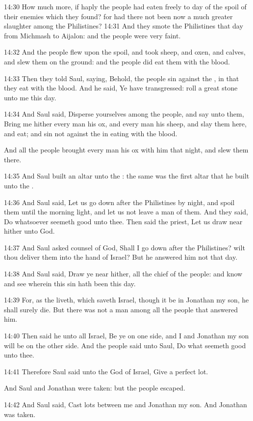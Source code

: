 14:30 How much more, if haply the people had eaten freely to day of the spoil of their enemies which they found? for had there not been now a much greater slaughter among the Philistines?  14:31 And they smote the Philistines that day from Michmash to Aijalon: and the people were very faint.

14:32 And the people flew upon the spoil, and took sheep, and oxen, and calves, and slew them on the ground: and the people did eat them with the blood.

14:33 Then they told Saul, saying, Behold, the people sin against the \LORD, in that they eat with the blood. And he said, Ye have transgressed: roll a great stone unto me this day.

14:34 And Saul said, Disperse yourselves among the people, and say unto them, Bring me hither every man his ox, and every man his sheep, and slay them here, and eat; and sin not against the \LORD in eating with the blood.

And all the people brought every man his ox with him that night, and slew them there.

14:35 And Saul built an altar unto the \LORD: the same was the first altar that he built unto the \LORD.

14:36 And Saul said, Let us go down after the Philistines by night, and spoil them until the morning light, and let us not leave a man of them. And they said, Do whatsoever seemeth good unto thee. Then said the priest, Let us draw near hither unto God.

14:37 And Saul asked counsel of God, Shall I go down after the Philistines? wilt thou deliver them into the hand of Israel? But he answered him not that day.

14:38 And Saul said, Draw ye near hither, all the chief of the people: and know and see wherein this sin hath been this day.

14:39 For, as the \LORD liveth, which saveth Israel, though it be in Jonathan my son, he shall surely die. But there was not a man among all the people that answered him.

14:40 Then said he unto all Israel, Be ye on one side, and I and Jonathan my son will be on the other side. And the people said unto Saul, Do what seemeth good unto thee.

14:41 Therefore Saul said unto the \LORD God of Israel, Give a perfect lot.

And Saul and Jonathan were taken: but the people escaped.

14:42 And Saul said, Cast lots between me and Jonathan my son. And Jonathan was taken.

